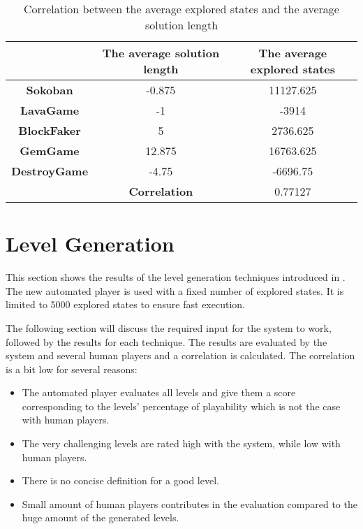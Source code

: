 \begin{table}[!ht]
	\centering
	\begin{tabular}{|c|c|c|}
		\hline
		 & \textbf{The average solution length} & \textbf{The average explored states}\\
		\hline
		\textbf{Sokoban} & -0.875 & 11127.625\\
		\hline
		\textbf{LavaGame} & -1 & -3914\\
		\hline
		\textbf{BlockFaker} & 5 & 2736.625\\
		\hline
		\textbf{GemGame} & 12.875 & 16763.625\\
		\hline
		\textbf{DestroyGame} & -4.75 & -6696.75\\
		\hline
		 & \textbf{Correlation} & 0.77127\\
		\hline
	\end{tabular}
	\caption{Correlation between the average explored states and the average solution length}
	\label{Table:playerCorrelation}
\end{table}

\section{Level Generation}
This section shows the results of the level generation techniques introduced in . The new automated player is used with a fixed number of explored states. It is limited to 5000 explored states to ensure fast execution.\\\par

The following section will discuss the required input for the system to work, followed by the results for each technique. The results are evaluated by the system and several human players and a correlation is calculated. The correlation is a bit low for several reasons:
\begin{itemize} \itemsep0pt \parskip0pt 
	\item The automated player evaluates all levels and give them a score corresponding to the levels' percentage of playability which is not the case with human players. 
	\item The very challenging levels are rated high with the system, while low with human players.
	\item There is no concise definition for a good level.
	\item Small amount of human players contributes in the evaluation compared to the huge amount of the generated levels.
\end{itemize}

